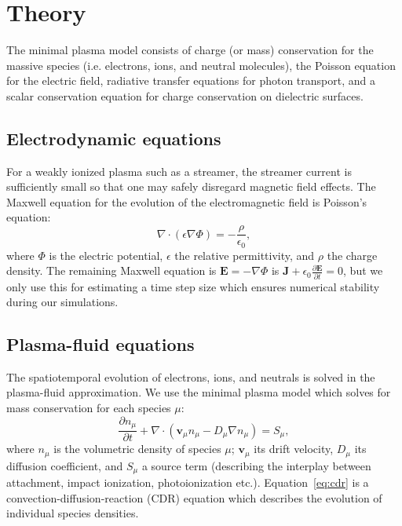 \documentclass[3p]{elsarticle}
\begin{document}
\section{Theory}
\label{sec:theory}
The minimal plasma model consists of charge (or mass) conservation for the massive species (i.e. electrons, ions, and neutral molecules), the Poisson equation for the electric field, radiative transfer equations for photon transport, and a scalar conservation equation for charge conservation on dielectric surfaces. 

\subsection{Electrodynamic equations}
\label{subsec:electrodynamic}
For a weakly ionized plasma such as a streamer, the streamer current is sufficiently small so that one may safely disregard magnetic field effects. The Maxwell equation for the evolution of the electromagnetic field is Poisson's equation:
\begin{equation}
  \nabla\cdot\left(\epsilon\nabla\Phi\right) = -\frac{\rho}{\epsilon_0},
\end{equation}
where $\Phi$ is the electric potential, $\epsilon$ the relative permittivity, and $\rho$ the charge density. The remaining Maxwell equation is $\bm{E} = -\nabla\Phi$ is $\bm{J} + \epsilon_0\frac{\partial\bm{E}}{\partial t} = 0$, but we only use this for estimating a time step size which ensures numerical stability during our simulations. 


\subsection{Plasma-fluid equations}
The spatiotemporal evolution of electrons, ions, and neutrals is solved in the plasma-fluid approximation. We use the minimal plasma model which solves for mass conservation for each species $\mu$:
\begin{equation}
  \label{eq:cdr}
  \frac{\partial n_\mu}{\partial t} + \nabla\cdot(\bm{v}_\mu n_\mu - D_\mu\nabla n_\mu) = S_\mu,
\end{equation}
where $n_\mu$ is the volumetric density of species $\mu$; $\bm{v}_\mu$ its drift velocity, $D_\mu$ its diffusion coefficient, and $S_\mu$ a source term (describing the interplay between attachment, impact ionization, photoionization etc.). Equation~\eqref{eq:cdr} is a convection-diffusion-reaction (CDR) equation which describes the evolution of individual species densities.
\end{document}
